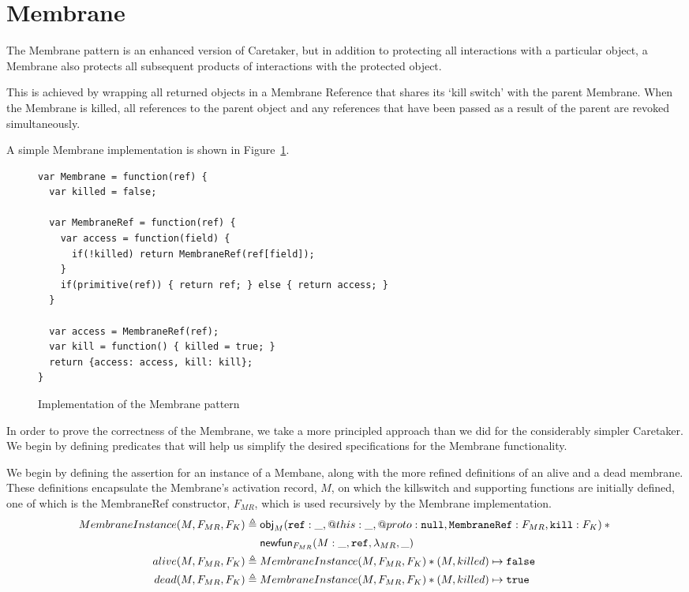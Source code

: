 \documentclass[a4paper,notitlepage]{report}
\begin{document}
\clearpage

\section{Membrane}
\label{sec:membrane}
The Membrane pattern is an enhanced version of Caretaker, but in addition to
protecting all
interactions with a particular object, a Membrane also protects all subsequent
products of interactions with the protected object.

This is achieved by wrapping all returned objects in a Membrane Reference that
shares its `kill switch' with the parent Membrane. When the Membrane is killed,
all references to the parent object and any references that have been passed as
a result of the parent are revoked simultaneously.

A simple Membrane implementation is shown in Figure~\ref{fig:code:membrane}.

\begin{figure}[h!]
\begin{verbatim}var Membrane = function(ref) {
  var killed = false;

  var MembraneRef = function(ref) {
    var access = function(field) {
      if(!killed) return MembraneRef(ref[field]);
    }
    if(primitive(ref)) { return ref; } else { return access; }
  }

  var access = MembraneRef(ref);
  var kill = function() { killed = true; }
  return {access: access, kill: kill};
}\end{verbatim}
  \caption{Implementation of the Membrane pattern}
  \label{fig:code:membrane}
\end{figure}

In order to prove the correctness of the Membrane, we take a more principled
approach than we did for the considerably simpler Caretaker. We begin by
defining predicates that will help us simplify the desired specifications for
the Membrane functionality.

We begin by defining the assertion for an instance of a Membane, along with the
more refined definitions of an alive and a dead membrane. These definitions
encapsulate the Membrane's activation record, $M$, on which the killswitch and
supporting functions are initially defined, one of which is the MembraneRef
constructor, $F_{MR}$, which is used recursively by the Membrane implementation.
\begin{align*}
  MembraneInstance(M, F_{MR}, F_K) & \triangleq \obj_M(\js{ref}: \_, @this: \_, @proto: \nil,
      \js{MembraneRef}: F_{MR}, \js{kill}: F_{K}) \sep {} \\
      & \phantom{{} \triangleq {}} \newfun_{F_{MR}}(M:\_, \js{ref}, \lambda_{MR}, \_) \\
  alive(M, F_{MR}, F_K) & \triangleq MembraneInstance(M, F_{MR}, F_K) \sep (M, killed) \pointsto \false \\
  dead(M, F_{MR}, F_K) & \triangleq MembraneInstance(M, F_{MR}, F_K) \sep (M, killed) \pointsto \true
\end{align*}
\end{document}
